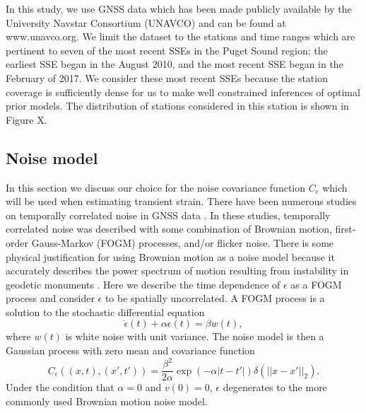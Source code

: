 \documentclass[10pt,a4paper]{article}
\begin{document}
In this study, we use GNSS data which has been made publicly available by the University Navstar Consortium (UNAVCO) \citep{Herring2016} and can be found at www.unavco.org.  We limit the dataset to the stations and time ranges which are pertinent to seven of the most recent SSEs in the Puget Sound region; the earliest SSE began in the August 2010, and the most recent SSE began in the February of 2017. We consider these most recent SSEs because the station coverage is sufficiently dense for us to make well constrained inferences of optimal prior models.  The distribution of stations considered in this station is shown in Figure X. 


\subsection{Noise model}\label{sec:NoiseModel}
In this section we discuss our choice for the noise covariance function $C_\epsilon$ which will be used when estimating transient strain.  There have been numerous studies on temporally correlated noise in GNSS data \citep[e.g.,][]{Zhang1997,Mao1999,Williams2004,Langbein2008}. In these studies, temporally correlated noise was described with some combination of Brownian motion, first-order Gauss-Markov (FOGM) processes, and/or flicker noise. There is some physical justification for using Brownian motion as a noise model because it accurately describes the power spectrum of motion resulting from instability in geodetic monuments \citep[e.g.,][]{Wyatt1982,Wyatt1989,Langbein1997}. Here we describe the time dependence of $\epsilon$ as a FOGM process and consider $\epsilon$ to be spatially uncorrelated. A FOGM process is a solution to the stochastic differential equation
\begin{equation}
\dot{\epsilon}(t) + \alpha \epsilon(t) = \beta w(t),
\end{equation}
where $w(t)$ is white noise with unit variance. The noise model is then a Gaussian process with zero mean and covariance function
\begin{equation}\label{eq:FOGM}
C_\epsilon\left((x,t),(x',t')\right) = \frac{\beta^2}{2\alpha}\exp\left(-\alpha|t - t'|\right) \delta(||x - x'||_2). 
\end{equation}
Under the condition that $\alpha = 0$ and $v(0) = 0$, $\epsilon$ degenerates to the more commonly used Brownian motion noise model. 
\end{document}
